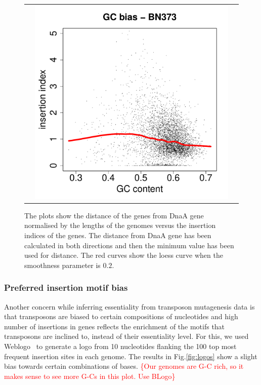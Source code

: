 \documentclass[12pt,letterpaper]{article}
\begin{document}
\begin{figure}
\begin{tabular}{c c c}
&\includegraphics[page=38, scale=0.25]{biases.pdf}&\\
\end{tabular}
\caption{The plots show the distance of the genes from DnaA gene normalised by the lengths of the genomes versus the insertion indices of the genes. The distance from DnaA gene has been calculated in both directions and then the minimum value has been used for distance. The red curves show the loess curve when the smoothness parameter is $0.2$.}
\label{fig:distance-bias}
\end{figure}

\subsubsection{Preferred insertion motif bias}
Another concern while inferring essentiality from transposon mutagenesis data is that transposons are biased to certain compositions of nucleotides and high number of insertions in genes reflects the enrichment of the motifs that transposons are inclined to, instead of their essentiality level. For this, we used Weblogo~\cite{crooks_weblogo:_2004} to generate a logo from 10 nucleotides flanking the 100 top most frequent insertion sites in each genome. The results in Fig.\@  \ref{fig:logos} show a slight bias towards certain combinations of bases. \textcolor{red}{\{Our genomes are G-C rich, so it makes sense to see more G-Cs in this plot. Use BLogo\}}
\end{document}

